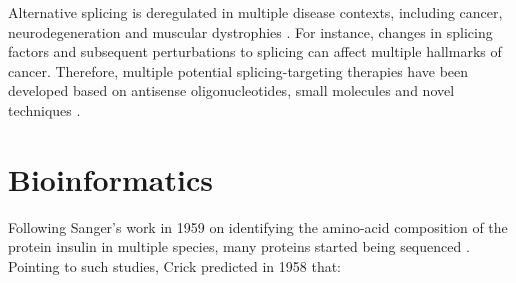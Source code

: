 Alternative splicing is deregulated in multiple disease contexts, including cancer, neurodegeneration and muscular dystrophies \cite{montes:2019ww}. For instance, changes in splicing factors and subsequent  perturbations to splicing can affect multiple hallmarks of cancer. Therefore, multiple potential splicing-targeting therapies have been developed based on antisense oligonucleotides, small molecules and novel techniques \cite{montes:2019ww}.



\section{Bioinformatics}




Following Sanger's work in 1959 on identifying the amino-acid composition of the protein insulin in multiple species, many proteins started being sequenced \cite{sanger:1955uw,ryle:1955wf,harris:1956ut,gauthier:2018ws}.
Pointing to such studies, Crick predicted in 1958 that:

